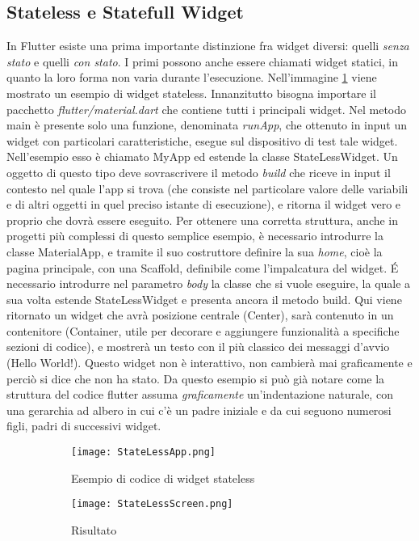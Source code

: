 	\subsection{Stateless e Statefull Widget}
	In Flutter esiste una prima importante distinzione fra widget diversi:
	quelli \textit{senza stato} e quelli \textit{con stato}. I primi possono
	anche essere chiamati widget statici, in quanto la loro forma non varia
	durante l'esecuzione. Nell'immagine \ref{stateless1}  viene mostrato un esempio di widget
	stateless. Innanzitutto bisogna importare il pacchetto
	\textit{flutter/material.dart} che contiene tutti i principali widget. Nel
	metodo main è presente solo una funzione, denominata \textit{runApp}, che
	ottenuto in input un widget con particolari caratteristiche, esegue sul
	dispositivo di test tale widget. Nell'esempio esso è chiamato MyApp ed
	estende la classe StateLessWidget. Un oggetto di questo tipo deve
	sovrascrivere il metodo \textit{build} che riceve in input il contesto nel
	quale l'app si trova (che consiste nel particolare valore delle variabili e
	di altri oggetti in quel preciso istante di esecuzione), e ritorna il widget
	vero e proprio che dovrà essere eseguito. Per ottenere una corretta
	struttura, anche in progetti più complessi di questo semplice esempio, è
	necessario introdurre la classe MaterialApp, e tramite il suo costruttore
	definire la sua \textit{home}, cioè la pagina principale, con una Scaffold,
	definibile come l'impalcatura del widget. \'E necessario introdurre nel parametro
	\textit{body} la classe che si vuole eseguire, la quale a sua volta estende
	StateLessWidget e presenta ancora il metodo build. Qui viene ritornato un
	widget che avrà posizione centrale (Center), sarà contenuto in un
	contenitore (Container, utile per decorare e aggiungere funzionalità a
	specifiche sezioni di codice), e mostrerà un testo con il più classico dei
	messaggi d'avvio (Hello World!). Questo widget non è interattivo, non
	cambierà mai graficamente e perciò si dice che non ha stato.
	Da questo esempio si può già notare come la
	struttura del codice flutter assuma \textit{graficamente} un'indentazione
	naturale, con una gerarchia ad albero in cui c'è un padre iniziale e da cui
	seguono numerosi figli, padri di successivi widget.

	\begin{figure}[h!]
		\centering
		\begin{subfigure}{0.6\linewidth}
			\texttt{[image: StateLessApp.png]}
			\caption{Esempio di codice di widget stateless}
		\end{subfigure}
		\begin{subfigure}{0.3\linewidth}
			\texttt{[image: StateLessScreen.png]}
			\caption{Risultato}
		\end{subfigure}
		\caption{}
		\label{stateless1}
	\end{figure} 

